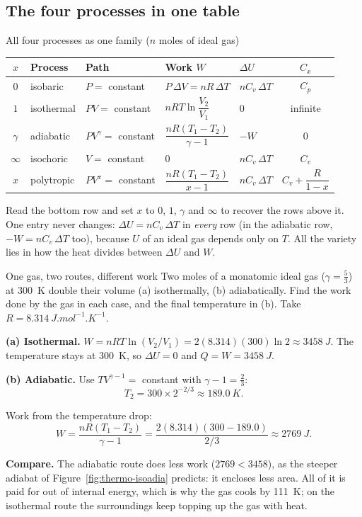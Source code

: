\subsection{The four processes in one table}

\begin{tablebox}{All four processes as one family (\texorpdfstring{$n$}{n} moles of ideal gas)}
\begin{center}
\renewcommand{\arraystretch}{1.35}
\begin{tabular}{@{}cllllc@{}}
\toprule
$x$ & Process & Path & Work $W$ & $\Delta U$ & $C_x$\\
\midrule
$0$ & isobaric & $P=$ constant & $P\,\Delta V=nR\,\Delta T$ & $nC_v\,\Delta T$ & $C_p$\\
$1$ & isothermal & $PV=$ constant & $nRT\ln\dfrac{V_2}{V_1}$ & $0$ & infinite\\
$\gamma$ & adiabatic & $PV^\gamma=$ constant & $\dfrac{nR(T_1-T_2)}{\gamma-1}$ & $-W$ & $0$\\
$\infty$ & isochoric & $V=$ constant & $0$ & $nC_v\,\Delta T$ & $C_v$\\
\midrule
$x$ & polytropic & $PV^x=$ constant & $\dfrac{nR(T_1-T_2)}{x-1}$ & $nC_v\,\Delta T$ & $C_v+\dfrac{R}{1-x}$\\
\bottomrule
\end{tabular}\label{tab:processes}
\end{center}
Read the bottom row and set $x$ to $0$, $1$, $\gamma$ and $\infty$ to recover the rows above it. One
entry never changes: $\Delta U=nC_v\,\Delta T$ in \emph{every} row (in the adiabatic row,
$-W=nC_v\,\Delta T$ too), because $U$ of an ideal gas depends only on $T$. All the variety lies in how the
heat divides between $\Delta U$ and $W$.
\end{tablebox}

\begin{exbox}{One gas, two routes, different work}\label{ex:thermo-isoadia}
Two moles of a monatomic ideal gas ($\gamma=\tfrac53$) at \SI{300}{K} double their volume (a)
isothermally, (b) adiabatically. Find the work done by the gas in each case, and the final temperature in
(b). Take $R=\SI{8.314}{J.mol^{-1}.K^{-1}}$.

 \textbf{(a) Isothermal.} $W=nRT\ln(V_2/V_1)=2(8.314)(300)\ln2\approx\SI{3458}{J}$. The temperature
stays at \SI{300}{K}, so $\Delta U=0$ and $Q=W=\SI{3458}{J}$.

 \textbf{(b) Adiabatic.} Use $TV^{\gamma-1}=$ constant with $\gamma-1=\tfrac23$:
\[ T_2=300\times2^{-2/3}\approx\SI{189.0}{K}. \]

 Work from the temperature drop:
\[ W=\frac{nR(T_1-T_2)}{\gamma-1}=\frac{2(8.314)(300-189.0)}{2/3}\approx\SI{2769}{J}. \]

 \textbf{Compare.} The adiabatic route does less work ($2769<3458$), as the steeper adiabat of
Figure~\ref{fig:thermo-isoadia} predicts: it encloses less area. All of it is paid for out of internal
energy, which is why the gas cools by \SI{111}{K}; on the isothermal route the surroundings keep topping
up the gas with heat.
\end{exbox}

